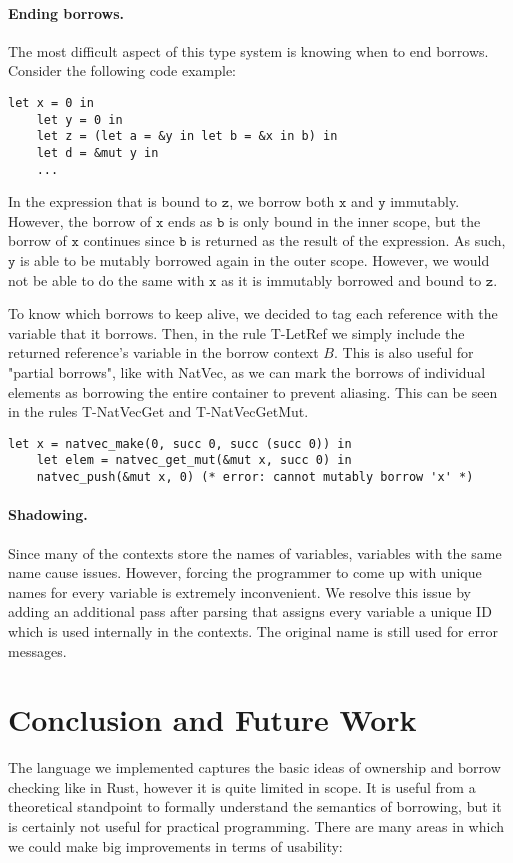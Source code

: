 \documentclass[letterpaper,11pt]{article}
\begin{document}
\paragraph{Ending borrows.}
The most difficult aspect of this type system is knowing when to end borrows. Consider the following code example:
\begin{lstlisting}[language=caml]
    let x = 0 in 
    let y = 0 in 
    let z = (let a = &y in let b = &x in b) in 
    let d = &mut y in 
    ...
\end{lstlisting}
In the expression that is bound to $\mathtt{z}$, we borrow both $\mathtt{x}$ and $\mathtt{y}$ immutably.
However, the borrow of $\mathtt{x}$ ends as $\mathtt{b}$ is only bound in the inner scope, 
but the borrow of $\mathtt{x}$ continues since $\mathtt{b}$ is returned as the result of the expression.
As such, $\mathtt{y}$ is able to be mutably borrowed again in the outer scope. However, we would not be 
able to do the same with $\mathtt{x}$ as it is immutably borrowed and bound to $\mathtt{z}$.

To know which borrows to keep alive, we decided to tag each reference with the variable that it borrows.
Then, in the rule T-LetRef we simply include the returned reference's variable in the borrow context $B$.
This is also useful for "partial borrows", like with NatVec, as we can mark the borrows of individual
elements as borrowing the entire container to prevent aliasing. This can be seen in the rules T-NatVecGet
and T-NatVecGetMut.
\begin{lstlisting}[language=caml]
    let x = natvec_make(0, succ 0, succ (succ 0)) in
    let elem = natvec_get_mut(&mut x, succ 0) in
    natvec_push(&mut x, 0) (* error: cannot mutably borrow 'x' *)
\end{lstlisting}

\paragraph{Shadowing.} Since many of the contexts store the names of variables,
variables with the same name cause issues. However, forcing the programmer to 
come up with unique names for every variable is extremely inconvenient. We resolve this issue
by adding an additional pass after parsing that assigns every variable a unique ID which is used internally
in the contexts. The original name is still used for error messages.


\section{Conclusion and Future Work}
The language we implemented captures the basic ideas of ownership and borrow checking like in Rust, however it is quite limited in scope. It is useful from a theoretical standpoint to formally understand the semantics of borrowing, but
it is certainly not useful for practical programming. There are many areas in which we could make big improvements in terms of usability:
\end{document}
